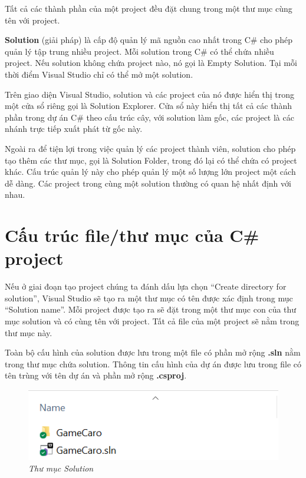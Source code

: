 Tất cả các thành phần của một project đều đặt chung trong một thư mục cùng tên với project.

\textbf{Solution} (giải pháp) là cấp độ quản lý mã nguồn cao nhất trong C\# cho phép quản lý tập trung nhiều project. Mỗi solution trong C\# có thể chứa nhiều project. Nếu solution không chứa project nào, nó gọi là Empty Solution. Tại mỗi thời điểm Visual Studio chỉ có thể mở một solution. 

Trên giao diện Visual Studio, solution và các project của nó được hiển thị trong một cửa sổ riêng gọi là Solution Explorer. Cửa sổ này hiển thị tất cả các thành phần trong dự án C\# theo cấu trúc cây, với solution làm gốc, các project là các nhánh trực tiếp xuất phát từ gốc này.

Ngoài ra để tiện lợi trong việc quản lý các project thành viên, solution cho phép tạo thêm các thư mục, gọi là Solution Folder, trong đó lại có thể chứa có project khác. Cấu trúc quản lý này cho phép quản lý một số lượng lớn project một cách dễ dàng. Các project trong cùng một solution thường có quan hệ nhất định với nhau.

\section{Cấu trúc file/thư mục của C\# project}

Nếu ở giai đoạn tạo project chúng ta đánh dấu lựa chọn ``Create directory for solution'', Visual Studio sẽ tạo ra một thư mục có tên được xác định trong mục ``Solution name''. Mỗi project được tạo ra sẽ đặt trong một thư mục con của thư mục solution và có cùng tên với project. Tất cả file của một project sẽ nằm trong thư mục này. 

Toàn bộ cấu hình của solution được lưu trong một file có phần mở rộng \textbf{.sln} nằm trong thư mục chứa solution. Thông tin cấu hình của dự án được lưu trong file có tên trùng với tên dự án và phần mở rộng \textbf{.csproj}.

\begin{figure}[h!]
	\centering
	\includegraphics[scale=.99]{image/dic01.png}
	\caption{\textit{Thư mục Solution}} 
\end{figure}

